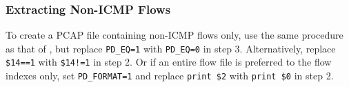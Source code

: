 \documentclass[documentation]{subfiles}
\begin{document}
\subsubsection{Extracting Non-ICMP Flows}
To create a PCAP file containing non-ICMP flows only, use the same procedure as that of ,
but replace {\tt PD\_EQ=1} with {\tt PD\_EQ=0} in step 3.
Alternatively, replace {\tt \$14==1} with {\tt \$14!=1} in step 2.
Or if an entire flow file is preferred to the flow indexes only, set {\tt PD\_FORMAT=1} and replace {\tt print \$2} with {\tt print \$0} in step 2.
\end{document}
